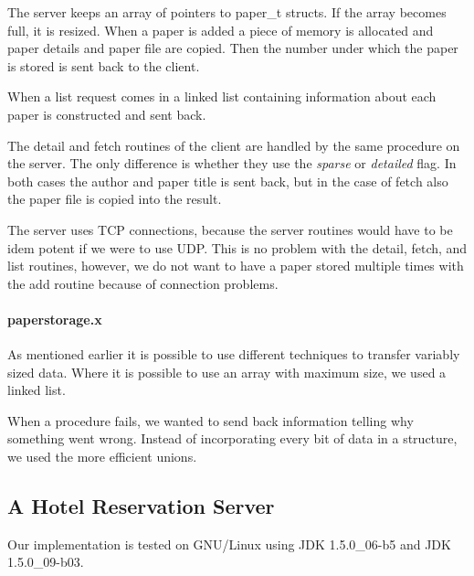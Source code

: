 \documentclass[a4paper,10pt]{article}
\begin{document}
The server keeps an array of pointers to paper\_t structs. If the array becomes full, it is resized. When a paper is added a piece of memory is allocated and paper details and paper file are copied. Then the number under which the paper is stored is sent back to the client.

When a list request comes in a linked list containing information about each paper is constructed and sent back.

The detail and fetch routines of the client are handled by the same procedure on the server. The only difference is whether they use the \emph{sparse} or \emph{detailed} flag. In both cases the author and paper title is sent back, but in the case of fetch also the paper file is copied into the result.

The server uses TCP connections, because the server routines would have to be idem potent if we were to use UDP. This is no problem with the detail, fetch, and list routines, however, we do not want to have a paper stored multiple times with the add routine because of connection problems. 

\paragraph{paperstorage.x}
As mentioned earlier it is possible to use different techniques to transfer variably sized data. Where it is possible to use an array with maximum size, we used a linked list.

When a procedure fails, we wanted to send back information telling why something went wrong. Instead of incorporating every bit of data in a structure, we used the more efficient unions.

\subsection{A Hotel Reservation Server}\label{sec:hotel}
Our implementation is tested on GNU/Linux using JDK 1.5.0\_06-b5 and JDK 1.5.0\_09-b03.
\end{document}
